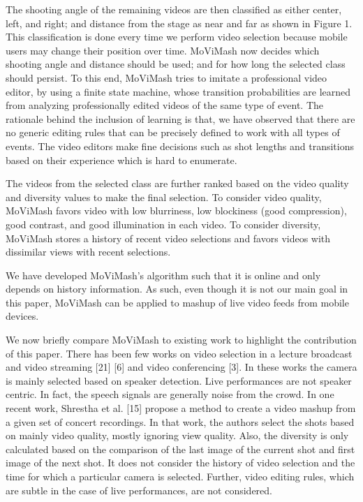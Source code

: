 \documentclass{sig-alternate-05-2015}
\begin{document}
The shooting angle of the remaining videos are then classified as either center, left, and right; and distance from the stage as near and far as shown in Figure 1. This classification is done every time we perform video selection because mobile users may change their position over time. MoViMash now decides which shooting angle and distance should be used; and for how long the selected class should persist. To this end, MoViMash tries to imitate a professional video editor, by using a finite state machine, whose transition probabilities are learned from analyzing professionally edited videos of the same type of event. The rationale behind the inclusion of learning is that, we have observed that there are no generic editing rules that can be precisely defined to work with all types of events. The video editors make fine decisions such as shot lengths and transitions based on their experience which is hard to enumerate.

The videos from the selected class are further ranked based on the video quality and diversity values to make the final selection. To consider video quality, MoViMash favors video with low blurriness, low blockiness (good compression), good contrast, and good illumination in each video. To consider diversity, MoViMash stores a history of recent video selections and favors videos with dissimilar views with recent selections.

We have developed MoViMash’s algorithm such that it is online and only depends on history information. As such, even though it is not our main goal in this paper, MoViMash can be applied to mashup of live video feeds from mobile devices.

We now briefly compare MoViMash to existing work to highlight the contribution of this paper. There has been few works on video selection in a lecture broadcast and video streaming [21] [6] and video conferencing [3]. In these works the camera is mainly selected based on speaker detection. Live performances are not speaker centric. In fact, the speech signals are generally noise from the crowd. In one recent work, Shrestha et al. [15] propose a method to create a video mashup from a given set of concert recordings. In that work, the authors select the shots based on mainly video quality, mostly ignoring view quality. Also, the diversity is only calculated based on the comparison of the last image of the current shot and first image of the next shot. It does not consider the history of video selection and the time for which a particular camera is selected. Further, video editing rules, which are subtle in the case of live performances, are not considered.
\end{document}
